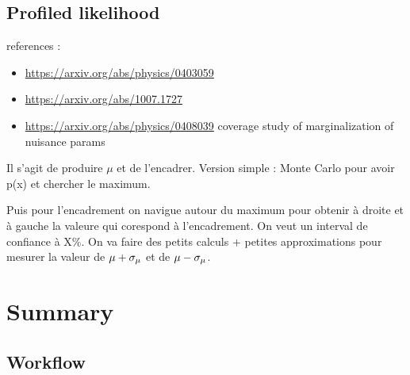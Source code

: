 \subsection{Profiled likelihood} %
\label{sub:profiled_likelihood}




references : 
\begin{itemize}
	\item \url{https://arxiv.org/abs/physics/0403059}
	\item \url{https://arxiv.org/abs/1007.1727}
	\item \url{https://arxiv.org/abs/physics/0408039} coverage study of marginalization of nuisance params
\end{itemize}




Il s'agit de produire $\mu$ et de l'encadrer.
Version simple : Monte Carlo pour avoir p(x) et chercher le maximum.

Puis pour l'encadrement on navigue autour du maximum pour obtenir à droite et à gauche la valeure qui corespond à l'encadrement.
On veut un interval de confiance à X\%.
On va faire des petits calculs + petites approximations pour mesurer la valeur de $\mu + \sigma_\mu$ et de $\mu - \sigma_\mu$.







\section{Summary} %
\label{sec:summary}


\subsection{Workflow} %
\label{sub:workflow}


